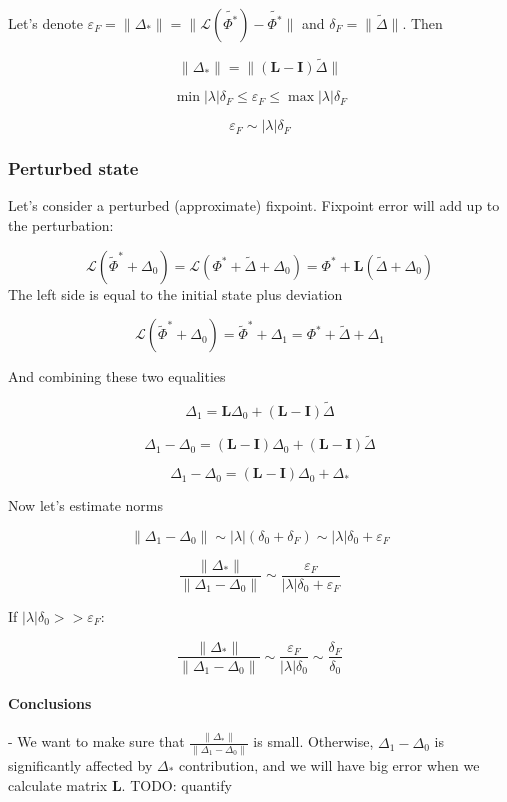 \documentclass[a4paper,12pt]{article}
\newcommand{\wt}{\widetilde} %
\newcommand{\FP}{\Phi^*}%
\newcommand{\D}{\Delta}%
\begin{document}
Let's denote
 $\varepsilon_{F}
 = \lVert \D_* \rVert
 =\lVert \mathcal{L}(\wt{\FP}) - \wt{\FP}  \rVert$
and $\delta_F = \lVert \wt{\D} \rVert $. Then

$$
\lVert \D_* \rVert = \lVert ( \mathbf{L} - \mathbf{I} ) \wt{\D} \rVert
$$


$$
\min|\lambda| \delta_F
\leq \varepsilon_{F}
\leq \max|\lambda| \delta_F
$$

$$
\varepsilon_{F} \sim |\lambda| \delta_F
$$



\subsubsection{Perturbed state}
Let's consider a perturbed (approximate) fixpoint. Fixpoint error will add up to the perturbation:

$$
\mathcal{L}(\wt{\Phi}^* + \D_0)
= \mathcal{L}(\FP + \wt  \D +  \D_0 )
= \FP +  \mathbf{L}  ( \wt{\D} +  \D_0 )
$$
The left side is equal to the initial state plus deviation

$$
\mathcal{L}(\wt \FP  + \D_0)
= \wt \FP + \D_1
= \FP + \wt{\D}  + \D_1
$$

And combining these two equalities

$$
\D_1
=  \mathbf{L}   \D_0  + (\mathbf{L} - \mathbf{I}) \wt{\D}
$$

$$
\D_1 - \D_0
=  (\mathbf{L} - \mathbf{I})  \D_0  + (\mathbf{L} - \mathbf{I}) \wt \D
$$

$$
\D_1 - \D_0
=  (\mathbf{L} - \mathbf{I})  \D_0  + \D_*
$$

Now let's estimate norms

$$
\lVert \D_1 - \D_0 \rVert
\sim
|\lambda|(\delta_0 + \delta_F)
\sim
|\lambda|\delta_0 + \varepsilon_F
$$

$$
\frac{ \lVert \D_* \rVert }  {\lVert \D_1 - \D_0 \rVert }
\sim
\frac{ \varepsilon_F } { |\lambda| \delta_0 + \varepsilon_F}
$$

If $|\lambda| \delta_0 >>  \varepsilon_{F}:$

$$
\frac{ \lVert \D_* \rVert }  {\lVert \D_1 - \D_0 \rVert }
\sim
\frac{ \varepsilon_F } { |\lambda| \delta_0}
\sim
\frac{ \delta_F } {  \delta_0 }
$$


\paragraph*{Conclusions}
- We want to make sure that $\frac{ \lVert \D_* \rVert }  {\lVert \D_1 - \D_0 \rVert } $ is small. Otherwise, $\D_1 - \D_0$ is significantly affected by $\D_*$ contribution, and we will have big error when we calculate matrix $\mathbf{L}$. TODO: quantify
\end{document}
